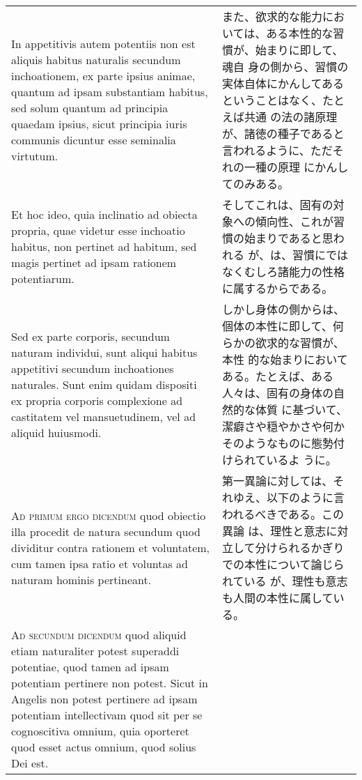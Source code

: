\documentclass[10pt]{jsarticle} %
\begin{document}
\begin{longtable}{p{21em}p{21em}}
In appetitivis autem potentiis non est aliquis habitus naturalis
secundum inchoationem, ex parte ipsius animae, quantum ad ipsam
substantiam habitus, sed solum quantum ad principia quaedam ipsius,
sicut principia iuris communis dicuntur esse seminalia virtutum.

&

また、欲求的な能力においては、ある本性的な習慣が、始まりに即して、魂自
身の側から、習慣の実体自体にかんしてあるということはなく、たとえば共通
の法の諸原理が、諸徳の種子であると言われるように、ただそれの一種の原理
にかんしてのみある。

\\



Et hoc ideo, quia inclinatio ad obiecta propria, quae videtur esse
inchoatio habitus, non pertinet ad habitum, sed magis pertinet ad
ipsam rationem potentiarum.


&

そしてこれは、固有の対象への傾向性、これが習慣の始まりであると思われる
が、は、習慣にではなくむしろ諸能力の性格に属するからである。

\\


Sed ex parte corporis, secundum naturam individui, sunt aliqui habitus
appetitivi secundum inchoationes naturales. Sunt enim quidam dispositi
ex propria corporis complexione ad castitatem vel mansuetudinem, vel
ad aliquid huiusmodi.

&

しかし身体の側からは、個体の本性に即して、何らかの欲求的な習慣が、本性
的な始まりにおいてある。たとえば、ある人々は、固有の身体の自然的な体質
に基づいて、潔癖さや穏やかさや何かそのようなものに態勢付けられているよ
うに。

\\


{\scshape Ad primum ergo dicendum} quod obiectio illa procedit de
natura secundum quod dividitur contra rationem et voluntatem, cum
tamen ipsa ratio et voluntas ad naturam hominis pertineant.

&

第一異論に対しては、それゆえ、以下のように言われるべきである。この異論
は、理性と意志に対立して分けられるかぎりでの本性について論じられている
が、理性も意志も人間の本性に属している。

\\




{\scshape Ad secundum dicendum} quod aliquid etiam naturaliter potest
superaddi potentiae, quod tamen ad ipsam potentiam pertinere non
potest. Sicut in Angelis non potest pertinere ad ipsam potentiam
intellectivam quod sit per se cognoscitiva omnium, quia oporteret quod
esset actus omnium, quod solius Dei est.


\end{longtable}
\end{document}
